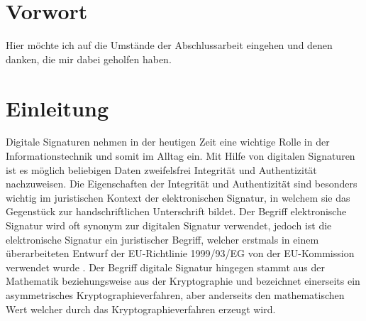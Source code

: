\documentclass[11pt,a4paper,ngerman]{report}
\begin{document}
\maketitle



\chapter*{Vorwort}
Hier möchte ich auf die Umstände der Abschlussarbeit eingehen und denen danken, die mir dabei geholfen haben.
\clearpage

\tableofcontents
\clearpage


\chapter{Einleitung}
Digitale Signaturen nehmen in der heutigen Zeit eine wichtige Rolle in der Informationstechnik und somit im Alltag ein. Mit Hilfe von digitalen Signaturen ist es möglich beliebigen Daten zweifelsfrei Integrität und Authentizität nachzuweisen. Die Eigenschaften der Integrität und Authentizität sind besonders wichtig im juristischen Kontext der elektronischen Signatur, in welchem sie das Gegenstück zur handschriftlichen Unterschrift bildet. Der Begriff elektronische Signatur wird oft synonym zur digitalen Signatur verwendet, jedoch ist die elektronische Signatur ein juristischer Begriff, welcher erstmals in einem überarbeiteten Entwurf der EU-Richtlinie 1999/93/EG von der EU-Kommission verwendet wurde \cite{eSigEU99}. Der Begriff digitale Signatur hingegen stammt aus der Mathematik beziehungsweise aus der Kryptographie und bezeichnet einerseits ein asymmetrisches Kryptographieverfahren, aber anderseits den mathematischen Wert welcher durch das Kryptographieverfahren erzeugt wird.
\end{document}
